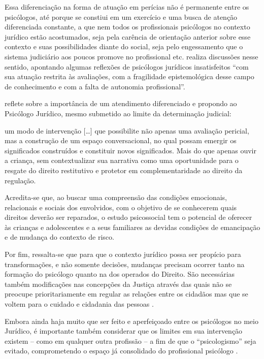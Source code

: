 Essa diferenciação na forma de atuação em perícias não é permanente entre os psicólogos, até porque se constiui em um exercício e uma busca de atenção diferenciada constante, a que nem todos os profissionais psicólogos no contexto jurídico estão acostumados, seja pela carência de orientação anterior sobre esse contexto e suas possibilidades diante do social, seja pelo engessamento que o sistema judiciário aos poucos promove no profissional etc.  realiza discussões nesse sentido, apontando algumas reflexões de psicólogos jurídicos insatisfeitos ``com sua atuação restrita às avaliações, com a  fragilidade epistemológica desse campo de conhecimento e com a falta de autonomia profissional''.

 reflete sobre a importância de um atendimento diferenciado e propondo ao Psicólogo Jurídico, mesmo submetido ao limite da determinação judicial:

\begin{citacao}
	um modo de intervenção [\ldots] que possibilite não apenas uma avaliação pericial, mas a construção de um espaço conversacional, no qual possam emergir os significados construídos e constituir novos significados. Mais do que apenas ouvir a criança, sem contextualizar sua narrativa como uma oportunidade para o resgate do direito restitutivo e protetor em complementaridade ao direito da regulação. 

	Acredita-se que, ao buscar uma compreensão das condições emocionais, relacionais e sociais dos envolvidos, com o objetivo de se conhecerem quais direitos deverão ser reparados, o estudo psicossocial tem o potencial de oferecer às crianças e adolescentes e a seus familiares as devidas condições de emancipação e de mudança do contexto de risco.
\end{citacao}

Por fim, ressalta-se que para que o contexto jurídico possa ser propício para transformações, e não somente decisões, mudanças precisam ocorrer tanto na formação do psicólogo quanto na dos operados do Direito. São necessárias também modificações nas concepções da Justiça através das quais não se preocupe prioritariamente em regular as relações entre os cidadãos mas que se voltem para o cuidado e cidadania das pessoas \cite{COSTA2009}. 

Embora ainda haja muito que ser feito e aperfeiçoado entre os psicólogos no meio Jurídico, é importante também considerar que os limites em sua intervenção existem -- como em qualquer outra profissão -- a fim de que o ``psicologismo'' seja evitado, comprometendo o espaço já consolidado do profissional psicólogo \cite[p. 34]{JESUS2001}.